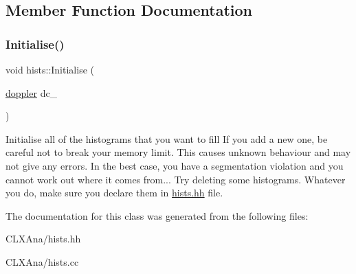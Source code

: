 \subsection{Member Function Documentation}
\mbox{\label{classhists_affb3dcaefba3b63d20bbe438030e2f81}} 
\subsubsection{\texorpdfstring{Initialise()}{Initialise()}}
{\footnotesize\ttfamily void hists\+::\+Initialise (\begin{DoxyParamCaption}\item[{\hyperlink{classdoppler}{doppler}}]{dc\+\_\+ }\end{DoxyParamCaption})}

Initialise all of the histograms that you want to fill If you add a new one, be careful not to break your memory limit. This causes unknown behaviour and may not give any errors. In the best case, you have a segmentation violation and you cannot work out where it comes from... Try deleting some histograms. Whatever you do, make sure you declare them in \hyperlink{hists_8hh_source}{hists.\+hh} file. 

The documentation for this class was generated from the following files\+:\begin{DoxyCompactItemize}
\item 
C\+L\+X\+Ana/hists.\+hh\item 
C\+L\+X\+Ana/hists.\+cc\end{DoxyCompactItemize}

